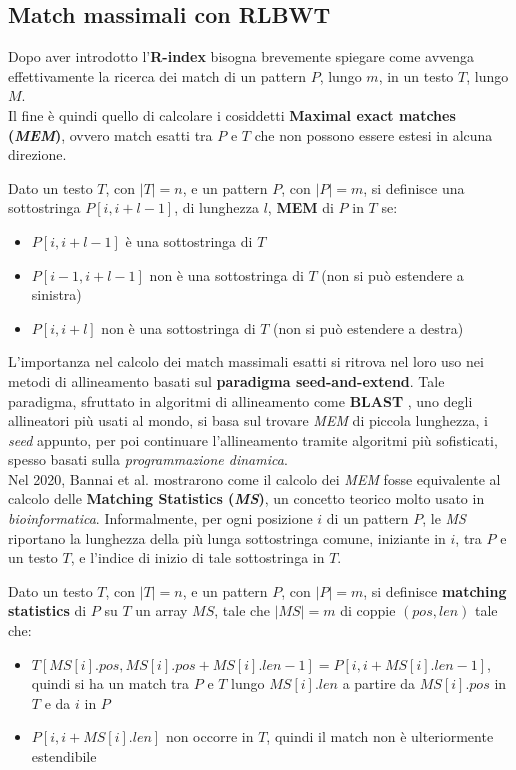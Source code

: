 \subsection{Match massimali con RLBWT}
Dopo aver introdotto l'\textbf{R-index} bisogna brevemente spiegare come avvenga
effettivamente la ricerca dei match di un pattern $P$, lungo $m$, in un
testo $T$, lungo $M$.\\
Il fine è quindi quello di calcolare i cosiddetti \textbf{Maximal exact matches
  (\textit{MEM})}, ovvero match esatti tra $P$ e $T$ che non possono essere
estesi in alcuna direzione.
\begin{definizione}
  Dato un testo $T$, con $|T|=n$, e un pattern $P$, con $|P|=m$, si definisce
  una sottostringa $P[i,i+l-1]$, di lunghezza $l$, \textbf{MEM} di $P$ in $T$
  se:
  \begin{itemize}
    \item $P[i,i+l-1]$ è una sottostringa di $T$
    \item $P[i-1,i+l-1]$ non è una sottostringa di $T$ (non si può estendere a
    sinistra) 
    \item $P[i,i+l]$ non è una sottostringa di $T$ (non si può estendere a
    destra) 
  \end{itemize}
\end{definizione}
L'importanza nel calcolo dei match massimali esatti si ritrova nel loro uso nei
metodi di allineamento basati sul \textbf{paradigma seed-and-extend}.
Tale paradigma, sfruttato in algoritmi di allineamento come \textbf{BLAST}
\cite{blast}, uno degli allineatori più usati al mondo, si basa sul trovare
\textit{MEM} di piccola lunghezza, i \textit{seed} appunto, per poi continuare
l'allineamento tramite algoritmi più sofisticati, spesso basati sulla
\textit{programmazione dinamica}. \\
Nel 2020, Bannai et al. \cite{bannai} mostrarono come il calcolo dei
\textit{MEM} fosse equivalente al calcolo delle \textbf{Matching Statistics
  (\textit{MS})}, un concetto teorico molto usato in
\textit{bioinformatica}. Informalmente, per ogni posizione $i$ di un pattern
$P$, le \textit{MS} riportano la lunghezza della più lunga sottostringa comune,
iniziante in $i$, tra $P$ e un testo $T$, e l'indice di inizio di tale
sottostringa in $T$.
\begin{definizione}
  Dato un testo $T$, con $|T|=n$, e un pattern $P$, con $|P|=m$, si definisce
  \textbf{matching statistics} di $P$ su $T$ un array $MS$, tale che $|MS|=m$
  di coppie $(pos, len)$ tale che:
  \begin{itemize}
    \item $T[MS[i].pos,MS[i].pos+MS[i].len-1]=P[i,i+MS[i].len-1]$, quindi si ha
    un match tra $P$ e $T$ lungo $MS[i].len$ a partire da $MS[i].pos$ in $T$ e
    da $i$ in $P$
    \item $P[i,i+MS[i].len]$ non occorre in $T$, quindi il match non è
    ulteriormente estendibile 
  \end{itemize}
\end{definizione}
